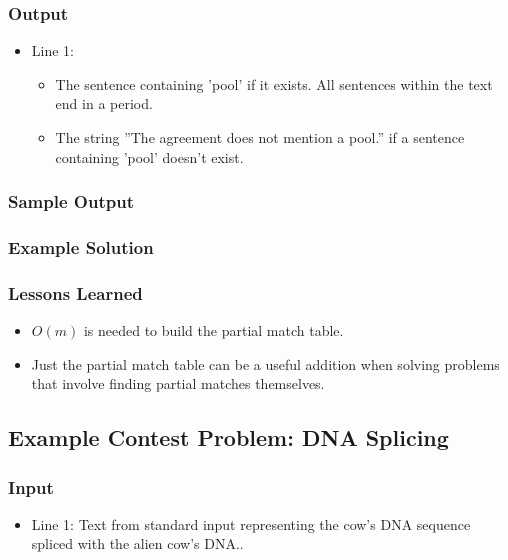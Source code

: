 \subsubsection{Output}
\begin{itemize}
	\item Line 1:
	\begin{itemize}
		\item The sentence containing 'pool' if it exists. All sentences within the text end in a period.
		\item The string ''The agreement does not mention a pool.'' if a sentence containing 'pool' doesn't exist.
	\end{itemize}
\end{itemize}

\subsubsection{Sample Output}

\subsubsection{Example Solution}

\subsubsection{Lessons Learned}
\begin{itemize}
	\item $O(m)$ is needed to build the partial match table.
	\item Just the partial match table can be a useful addition when solving problems that involve finding partial matches themselves.
\end{itemize}

\subsection{Example Contest Problem: DNA Splicing}

\subsubsection{Input}
\begin{itemize}
\item Line 1: Text from standard input representing the cow's DNA sequence spliced with the alien cow's DNA..
\end{itemize}

